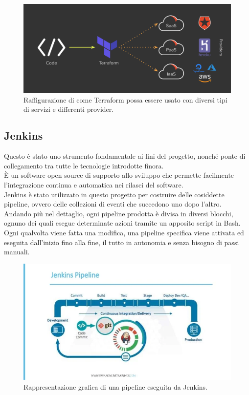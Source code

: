 \documentclass[a4paper,12pt]{report}
\begin{document}
\begin{figure}[h]
	\includegraphics[width=1.0\textwidth]{terraform}
    \caption{Raffigurazione di come Terraform possa essere usato con diversi tipi di servizi e differenti provider. \cite{terraformimg}}
    \label{fig:terraform}
\end{figure}

\subsection{Jenkins}
Questo è stato uno strumento fondamentale ai fini del progetto, nonché ponte di collegamento tra tutte le tecnologie introdotte finora. \\
È un software open source di supporto allo sviluppo che permette facilmente l'integrazione continua e automatica nei rilasci del software.\cite{jenkins}\\
Jenkins è stato utilizzato in questo progetto per costruire delle cosiddette pipeline, ovvero delle collezioni di eventi che succedono uno dopo l'altro. Andando più nel dettaglio, ogni pipeline prodotta è divisa in diversi blocchi, ognuno dei quali esegue determinate azioni tramite un apposito script in Bash.\\
Ogni qualvolta viene fatta una modifica, una pipeline specifica viene attivata ed eseguita dall'inizio fino alla fine, il tutto in autonomia e senza bisogno di passi manuali.

\begin{figure}[h]
	\includegraphics[width=1.0\textwidth]{jenkins}
    \caption{Rappresentazione grafica di una pipeline eseguita da Jenkins. \cite{jenkinsimg}}
    \label{fig:jenkins}
\end{figure}
\end{document}

